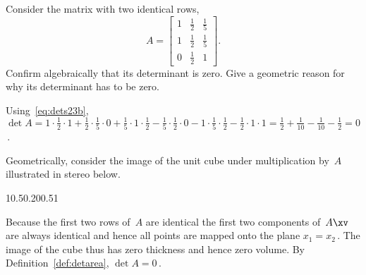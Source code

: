 \begin{example} \label{eg:}
Consider the matrix with two identical rows,
\begin{equation*}
A=\begin{bmatrix} 1&\frac12&\frac15
\\1&\frac12&\frac15
\\0&\frac12&1 \end{bmatrix}.
\end{equation*}
Confirm algebraically that its determinant is zero.
Give a geometric reason for why its determinant has to be zero.

\begin{solution} 
Using~\eqref{eq:dets23b}, \(\det A =1\cdot\frac12\cdot1 +\frac12\cdot\frac15\cdot0 +\frac15\cdot1\cdot\frac12
-\frac15\cdot\frac12\cdot0 -1\cdot\frac15\cdot\frac12 -\frac12\cdot1\cdot1 =\frac12+\frac1{10}-\frac1{10}-\frac12=0\)\,.

Geometrically, consider the image of the unit cube under multiplication by~\(A\) illustrated in stereo below. 
\begin{center}
1{0.5}{0.2}{0}{0.5}1
\end{center}
Because the first two rows of~\(A\) are identical the first two components of~\(A\xv\) are always identical and hence all points are mapped onto the plane \(x_1=x_2\)\,.  
The image of the cube thus has zero thickness and hence zero volume.
By Definition~\ref{def:detarea}, \(\det A=0\)\,.
\end{solution}
\end{example}




